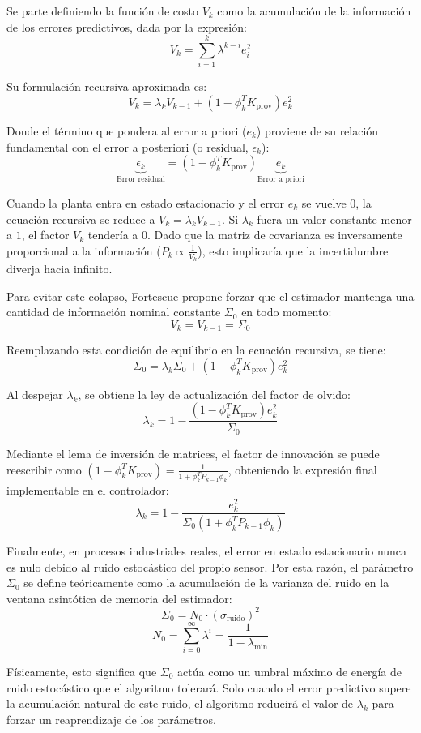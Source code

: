Se parte definiendo la función de costo $V_k$ como la acumulación de la información de los errores predictivos, dada por la expresión:
\[
  V_k = \sum_{i=1}^{k} \lambda^{k-i} e^2_i
\]

Su formulación recursiva aproximada es:
\[
  V_k = \lambda_k V_{k-1} + (1-\phi^T_k K_{\mathrm{prov}})e_k^2
\]

Donde el término que pondera al error a priori ($e_k$) proviene de su relación fundamental con el error a posteriori (o residual, $\epsilon_k$):
\[
\underbrace{\epsilon_k}_{\text{Error residual}}
=
(1-\phi^T_k K_{\mathrm{prov}})
\underbrace{e_k}_{\text{Error a priori}}
\]

Cuando la planta entra en estado estacionario y el error $e_k$ se vuelve $0$, la ecuación recursiva se reduce a $V_k = \lambda_k V_{k-1}$. Si $\lambda_k$ fuera un valor constante menor a $1$, el factor $V_k$ tendería a $0$. Dado que la matriz de covarianza es inversamente proporcional a la información ($P_k \propto \frac{1}{V_k}$), esto implicaría que la incertidumbre diverja hacia infinito.

Para evitar este colapso, Fortescue propone forzar que el estimador mantenga una cantidad de información nominal constante $\Sigma_0$ en todo momento:
\[
  V_k = V_{k-1} = \Sigma_0
\]

Reemplazando esta condición de equilibrio en la ecuación recursiva, se tiene:
\[
  \Sigma_0 = \lambda_k\Sigma_0 + (1-\phi^T_k K_{\mathrm{prov}})e_k^2
\]

Al despejar $\lambda_k$, se obtiene la ley de actualización del factor de olvido:
\[
  \lambda_k = 1 - \frac{(1 - \phi^T_k K_{\mathrm{prov}})e^2_k}{\Sigma_0}
\]

Mediante el lema de inversión de matrices, el factor de innovación se puede reescribir como $(1 - \phi_k^T K_{\mathrm{prov}}) = \frac{1}{1 + \phi_k^T P_{k-1} \phi_k}$, obteniendo la expresión final implementable en el controlador:
\[
  \lambda_k = 1 - \frac{e^2_k}{\Sigma_0(1 + \phi_k^T P_{k-1} \phi_k)}
\]

Finalmente, en procesos industriales reales, el error en estado estacionario nunca es nulo debido al ruido estocástico del propio sensor. Por esta razón, el parámetro $\Sigma_0$ se define teóricamente como la acumulación de la varianza del ruido en la ventana asintótica de memoria del estimador:
\[
  \Sigma_0 = N_0\cdot(\sigma_{\mathrm{ruido}})^2
\]
\[
  N_0 =\sum_{i=0}^{\infty}\lambda^i = \frac{1}{1 - \lambda_{\min}}
\]

Físicamente, esto significa que $\Sigma_0$ actúa como un umbral máximo de energía de ruido estocástico que el algoritmo tolerará. Solo cuando el error predictivo supere la acumulación natural de este ruido, el algoritmo reducirá el valor de $\lambda_k$ para forzar un reaprendizaje de los parámetros.
\clearpage
